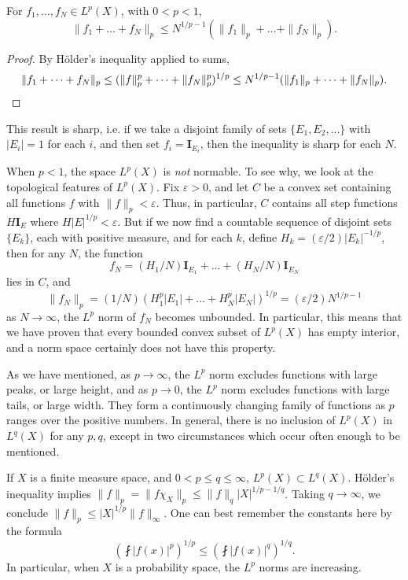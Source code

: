 \begin{theorem} \label{quasitriangleinequalitylp}
    For $f_1, \dots, f_N \in L^p(X)$, with $0 < p < 1$,
    \[ \| f_1 + \dots + f_N \|_p \leq N^{1/p - 1} (\| f_1 \|_p + \dots + \| f_N \|_p). \]
\end{theorem}
\begin{proof}
    By H\"{o}lder's inequality applied to sums,
    \[ \| f_1 + \dots + f_N \|_p \leq (\| f \|_p^p + \dots + \| f_N \|_p^p)^{1/p} \leq N^{1/p - 1} (\| f_1 \|_p + \dots + \| f_N \|_p). \qedhere \]
\end{proof}

This result is sharp, i.e. if we take a disjoint family of sets $\{ E_1, E_2, \dots \}$ with $|E_i| = 1$ for each $i$, and then set $f_i = \mathbf{I}_{E_i}$, then the inequality is sharp for each $N$.

\begin{remark}
    When $p < 1$, the space $L^p(X)$ is \emph{not} normable. To see why, we look at the topological features of $L^p(X)$. Fix $\varepsilon > 0$, and let $C$ be a convex set containing all functions $f$ with $\| f \|_p < \varepsilon$. Thus, in particular, $C$ contains all step functions $H \mathbf{I}_E$ where $H |E|^{1/p} < \varepsilon$. But if we now find a countable sequence of disjoint sets $\{ E_k \}$, each with positive measure, and for each $k$, define $H_k = (\varepsilon/2) |E_k|^{-1/p}$, then for any $N$, the function
    \[ f_N = (H_1/N) \mathbf{I}_{E_1} + \dots + (H_N/N) \mathbf{I}_{E_N} \]
    lies in $C$, and
    \[ \| f_N \|_p = (1/N) (H_1^p |E_1| + \dots + H_N^p |E_N|)^{1/p} = (\varepsilon/2) N^{1/p - 1} \]
    as $N \to \infty$, the $L^p$ norm of $f_N$ becomes unbounded. In particular, this means that we have proven that every bounded convex subset of $L^p(X)$ has empty interior, and a norm space certainly does not have this property.
\end{remark}

As we have mentioned, as $p \to \infty$, the $L^p$ norm excludes functions with large peaks, or large height, and as $p \to 0$, the $L^p$ norm excludes functions with large tails, or large width. They form a continuously changing family of functions as $p$ ranges over the positive numbers. In general, there is no inclusion of $L^p(X)$ in $L^q(X)$ for any $p,q$, except in two circumstances which occur often enough to be mentioned.

\begin{example}
  If $X$ is a finite measure space, and $0 < p \leq q \leq \infty$, $L^p(X) \subset L^q(X)$. H\"{o}lder's inequality implies $\| f \|_p = \| f \chi_X \|_p \leq \| f \|_q |X|^{1/p-1/q}$. Taking $q \to \infty$, we conclude $\| f \|_p \leq | X |^{1/p} \| f \|_\infty$. One can best remember the constants here by the formula
  \[ \left( \fint |f(x)|^p \right)^{1/p} \leq \left( \fint |f(x)|^q \right)^{1/q}. \]
  In particular, when $X$ is a probability space, the $L^p$ norms are increasing.
\end{example}

